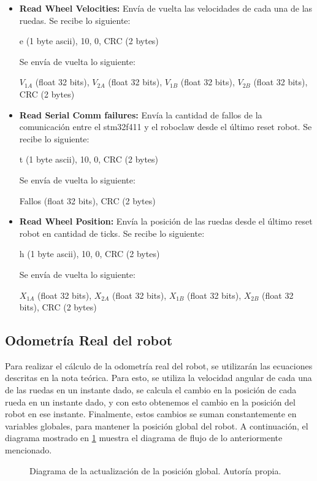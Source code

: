 \begin{itemize}
\item \textbf{Read Wheel Velocities:} Envía de vuelta las velocidades de cada una de las ruedas. Se recibe lo siguiente:

e (1 byte ascii), 10, 0, CRC (2 bytes)

Se envía de vuelta lo siguiente:

$V_{1A}$ (float 32 bits), $V_{2A}$ (float 32 bits), $V_{1B}$ (float 32 bits), $V_{2B}$ (float 32 bits), CRC (2 bytes)

\item \textbf{Read Serial Comm failures:} Envía la cantidad de fallos de la comunicación entre el stm32f411 y el roboclaw desde el último reset robot. Se recibe lo siguiente:

t (1 byte ascii), 10, 0, CRC (2 bytes)

Se envía de vuelta lo siguiente:

Fallos (float 32 bits), CRC (2 bytes)

\item \textbf{Read Wheel Position:} Envía la posición de las ruedas desde el último reset robot en cantidad de ticks. Se recibe lo siguiente:

h (1 byte ascii), 10, 0, CRC (2 bytes)

Se envía de vuelta lo siguiente:

$X_{1A}$ (float 32 bits), $X_{2A}$ (float 32 bits), $X_{1B}$ (float 32 bits), $X_{2B}$ (float 32 bits), CRC (2 bytes)

\end{itemize}

\subsection{Odometría Real del robot}

Para realizar el cálculo de la odometría real del robot, se utilizarán las ecuaciones descritas en la nota teórica. Para esto, se utiliza la velocidad angular de cada una de las ruedas en un instante dado, se calcula el cambio en la posición de cada rueda en un instante dado, y con esto obtenemos el cambio en la posición del robot en ese instante. Finalmente, estos cambios se suman constantemente en variables globales, para mantener la posición global del robot. A continuación, el diagrama mostrado en \ref{F:calculo_odometria} muestra el diagrama de flujo de lo anteriormente mencionado.

\begin{figure}[H]
\centering

\caption{Diagrama de la actualización de la posición global. Autoría propia.}
\label{F:calculo_odometria}
\end{figure}

